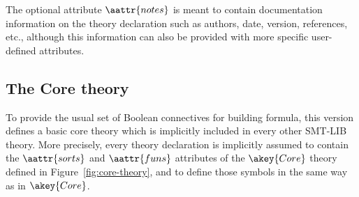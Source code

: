 The optional attribute $\aattr{notes}$ is meant 
to contain documentation information on the theory declaration 
such as authors, date, version, references, etc.,
although this information can also be provided 
with more specific user-defined attributes.


\subsection*{The Core theory}



To provide the usual set of Boolean connectives for building formula,
this version defines a basic core theory 
which is implicitly included in every other SMT-LIB theory.
More precisely, every theory declaration is implicitly assumed to contain
the $\aattr{sorts}$ and $\aattr{funs}$ attributes of the $\akey{Core}$ theory
defined in Figure~\ref{fig:core-theory},
and to define those symbols in the same way as in $\akey{Core}$.

